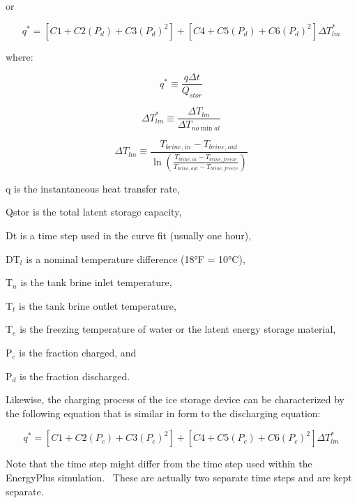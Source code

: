 or

\begin{equation}
{q^*} = \left[ {C1 + C2\left( {{P_d}} \right) + C3{{\left( {{P_d}} \right)}^2}} \right] + \left[ {C4 + C5\left( {{P_d}} \right) + C6{{\left( {{P_d}} \right)}^2}} \right]\Delta T_{lm}^*
\end{equation}

where:

\begin{equation}
{q^*} \equiv \frac{{q\Delta t}}{{{Q_{stor}}}}
\end{equation}

\begin{equation}
\Delta T_{lm}^* \equiv \frac{{\Delta {T_{lm}}}}{{\Delta {T_{no\min al}}}}
\end{equation}

\begin{equation}
\Delta {T_{lm}} \equiv \frac{{{T_{brine,in}} - {T_{brine,out}}}}{{\ln \left( {\frac{{{T_{brine,in}} - {T_{brine,freeze}}}}{{{T_{brine,out}} - {T_{brine,freeze}}}}} \right)}}
\end{equation}

q is the instantaneous heat transfer rate,

Qstor is the total latent storage capacity,

Dt is a time step used in the curve fit (usually one hour),

DT\(_{l}\) is a nominal temperature difference (18°F = 10°C),

T\(_{n}\) is the tank brine inlet temperature,

T\(_{t}\) is the tank brine outlet temperature,

T\(_{e}\) is the freezing temperature of water or the latent energy storage material,

P\(_{c}\) is the fraction charged, and

P\(_{d}\) is the fraction discharged.

Likewise, the charging process of the ice storage device can be characterized by the following equation that is similar in form to the discharging equation:

\begin{equation}
{q^*} = \left[ {C1 + C2\left( {{P_c}} \right) + C3{{\left( {{P_c}} \right)}^2}} \right] + \left[ {C4 + C5\left( {{P_c}} \right) + C6{{\left( {{P_c}} \right)}^2}} \right]\Delta T_{lm}^*
\end{equation}

Note that the time step might differ from the time step used within the EnergyPlus simulation.~ These are actually two separate time steps and are kept separate.

